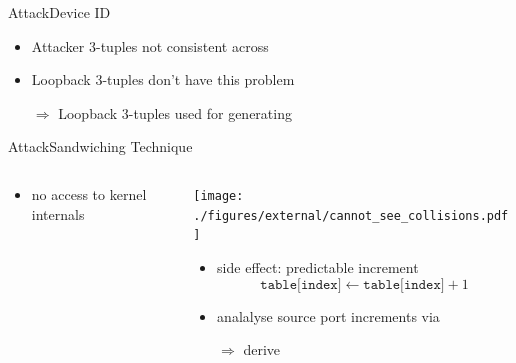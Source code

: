 \documentclass[aspectratio=169, hyperref={colorlinks=true, allcolors=SecondaryColor}, c]{beamer}
\begin{document}
\begin{frame}[fragile]{Attack}{Device ID}
	\begin{itemize}
		\item \alert{Attacker 3-tuples} not consistent across %
		\item \alert{Loopback 3-tuples} don't have this problem %
	\end{itemize}
	\begin{itemize}
		\item[\alert{$\Rightarrow$}] \alert{Loopback 3-tuples} used for generating 
	\end{itemize}
\end{frame}

\begin{frame}[fragile]{Attack}{Sandwiching Technique}
  \begin{columns}
    \begin{column}[t]{0.4\textwidth}
      \vspace{0cm}

			\begin{itemize}
				\item no access to \alert{kernel internals} %
			\end{itemize}
      \vspace{0.3cm}

		\end{column}
    \begin{column}[t]{0.6\textwidth}
      \vspace{0cm}

      \texttt{[image: ./figures/external/cannot\_see\_collisions.pdf]}
			\begin{itemize}
				\item \alert{side effect}: predictable increment
						\[
							\texttt{table[index]} \leftarrow \texttt{table[index]} + 1
						\]
          \item analalyse source port increments via 
          \item[\alert{$\Rightarrow$}] derive 
			\end{itemize}

		\end{column}
	\end{columns}
\end{frame}
\end{document}
